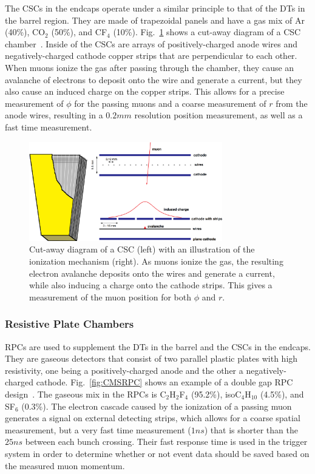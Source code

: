 The CSCs in the endcaps operate under a similar principle to that of the DTs in the barrel region.
They are made of trapezoidal panels and have a gas mix of Ar (40\%), CO$_2$ (50\%), and CF$_4$ (10\%).
Fig.~\ref{fig:CMSCSC} shows a cut-away diagram of a CSC chamber~\cite{collaboration_2013}.
Inside of the CSCs are arrays of positively-charged anode wires and negatively-charged cathode copper strips that are perpendicular to each other.
When muons ionize the gas after passing through the chamber, they cause an avalanche of electrons to deposit onto the wire and generate a current, but they also cause an induced charge on the copper strips.
This allows for a precise measurement of $\phi$ for the passing muons and a coarse measurement of $r$ from the anode wires, resulting in a $0.2\unit{mm}$ resolution position measurement, as well as a fast time measurement.

\begin{figure}[htbp]
  \centering
  \includegraphics[width=0.75\textwidth]{fig/experiment/cms_csc.pdf}
  \caption{
    Cut-away diagram of a CSC (left) with an illustration of the ionization mechanism (right).
    As muons ionize the gas, the resulting electron avalanche deposits onto the wires and generate a current, while also inducing a charge onto the cathode strips.
    This gives a measurement of the muon position for both $\phi$ and $r$.
  }
  \label{fig:CMSCSC}
\end{figure}

\subsubsection{Resistive Plate Chambers}

RPCs are used to supplement the DTs in the barrel and the CSCs in the endcaps.
They are gaseous detectors that consist of two parallel plastic plates with high resistivity, one being a positively-charged anode and the other a negatively-charged cathode.
Fig.~\ref{fig:CMSRPC} shows an example of a double gap RPC design~\cite{kumari2020improvedrpc}.
The gaseous mix in the RPCs is C$_2$H$_2$F$_4$ (95.2\%), isoC$_4$H$_{10}$ (4.5\%), and SF$_6$ (0.3\%).
The electron cascade caused by the ionization of a passing muon generates a signal on external detecting strips, which allows for a coarse spatial measurement, but a very fast time measurement ($1\unit{ns}$) that is shorter than the $25\unit{ns}$ between each bunch crossing.
Their fast response time is used in the trigger system in order to determine whether or not event data should be saved based on the measured muon momentum.

